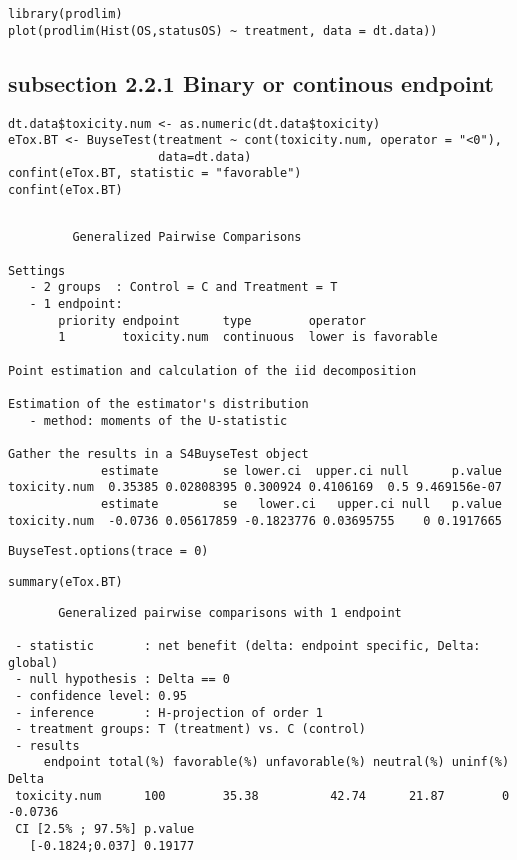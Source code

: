 \documentclass[12pt]{article}
\begin{document}
\lstset{language=r,label= ,caption= ,captionpos=b,numbers=none}
\begin{lstlisting}
library(prodlim)
plot(prodlim(Hist(OS,statusOS) ~ treatment, data = dt.data))
\end{lstlisting}

\subsection{subsection 2.2.1 Binary or continous endpoint}
\label{sec:orga3bc661}

\lstset{language=r,label= ,caption= ,captionpos=b,numbers=none}
\begin{lstlisting}
dt.data$toxicity.num <- as.numeric(dt.data$toxicity)
eTox.BT <- BuyseTest(treatment ~ cont(toxicity.num, operator = "<0"),
                     data=dt.data)
confint(eTox.BT, statistic = "favorable")
confint(eTox.BT)
\end{lstlisting}

\begin{verbatim}

         Generalized Pairwise Comparisons

Settings 
   - 2 groups  : Control = C and Treatment = T
   - 1 endpoint: 
       priority endpoint      type        operator           
       1        toxicity.num  continuous  lower is favorable 

Point estimation and calculation of the iid decomposition

Estimation of the estimator's distribution 
   - method: moments of the U-statistic

Gather the results in a S4BuyseTest object
             estimate         se lower.ci  upper.ci null      p.value
toxicity.num  0.35385 0.02808395 0.300924 0.4106169  0.5 9.469156e-07
             estimate         se   lower.ci   upper.ci null   p.value
toxicity.num  -0.0736 0.05617859 -0.1823776 0.03695755    0 0.1917665
\end{verbatim}

\lstset{language=r,label= ,caption= ,captionpos=b,numbers=none}
\begin{lstlisting}
BuyseTest.options(trace = 0)
\end{lstlisting}

\lstset{language=r,label= ,caption= ,captionpos=b,numbers=none}
\begin{lstlisting}
summary(eTox.BT)
\end{lstlisting}

\begin{verbatim}
       Generalized pairwise comparisons with 1 endpoint

 - statistic       : net benefit (delta: endpoint specific, Delta: global) 
 - null hypothesis : Delta == 0 
 - confidence level: 0.95 
 - inference       : H-projection of order 1
 - treatment groups: T (treatment) vs. C (control) 
 - results
     endpoint total(%) favorable(%) unfavorable(%) neutral(%) uninf(%)   Delta
 toxicity.num      100        35.38          42.74      21.87        0 -0.0736
 CI [2.5% ; 97.5%] p.value 
   [-0.1824;0.037] 0.19177
\end{verbatim}
\end{document}
